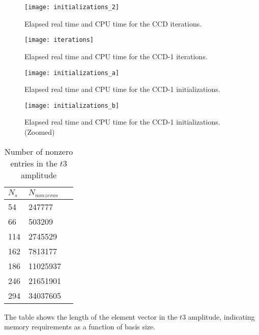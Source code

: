 \begin{figure}[!htb]
  \centering
  \texttt{[image: initializations\_2]}
  \caption{Elapsed real time and CPU time for the CCD iterations.}
\label{fig:ini2}
\end{figure}

\begin{figure}[!htb]
  \centering
  \texttt{[image: iterations]}
  \caption{Elapsed real time and CPU time for the CCD-1 iterations.}
\label{fig:it}
\end{figure}

\begin{figure}[!htb]
  \centering
  \texttt{[image: initializations\_a]}
  \caption{Elapsed real time and CPU time for the CCD-1 initializations.}
\label{fig:inia}
\end{figure}

\begin{figure}[!htb]
  \centering
  \texttt{[image: initializations\_b]}
  \caption{Elapsed real time and CPU time for the CCD-1 initializations. (Zoomed)}
\label{fig:inib}
\end{figure}


\begin{table}[h]
\caption{Number of nonzero entries in the $t3$ amplitude}
\begin{center}
\begin{threeparttable}
\begin{tabular}{l l l}
    \toprule
$N_s$ & $N_{nonzeros}$ \\ \hline 
54 & 247777 \\
66 & 503209 \\ 
114 & 2745529 \\
162 & 7813177 \\
186 & 11025937 \\
246 & 21651901 \\
294 & 34037605 \\
\bottomrule
\end{tabular}
\begin{tablenotes}
The table shows the length of the element vector in the $t3$ amplitude, indicating memory requirements as a function of basis size.
\end{tablenotes}
\end{threeparttable}
\end{center}
\label{tab:memscale}
\end{table}

